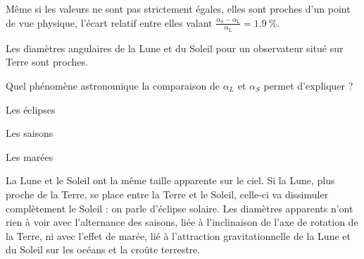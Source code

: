 \reponse{\reponseB{}}

\begin{corrige}
Même si les valeurs ne sont pas strictement égales, elles sont proches d'un point de vue physique, l'écart relatif entre elles valant $\frac{\alpha_\mathrm{S} - \alpha_\mathrm{L}}{\alpha_\mathrm{L}} = \SI{1,9}{\percent}$. 

Les diamètres angulaires de la Lune et du Soleil pour un observateur situé sur Terre sont proches. 
\end{corrige}




\begin{enonce}
Quel phénomène astronomique la comparaison de $\alpha_L$ et $\alpha_S$ permet d'expliquer ?

	\begin{listeQCM1Colonne}
	\item Les éclipses
	\item Les saisons
	\item Les marées
	\end{listeQCM1Colonne}
\end{enonce}

\reponse{\reponseA{}}

\begin{corrige}
La Lune et le Soleil ont la même taille apparente sur le ciel. Si la Lune, plus proche de la Terre, se place entre la Terre et le Soleil, celle-ci va dissimuler complètement le Soleil : on parle d'éclipse solaire. Les diamètres apparents n'ont rien à voir avec l'alternance des saisons, liée à l'inclinaison de l'axe de rotation de la Terre, ni avec l'effet de marée, lié à l'attraction gravitationnelle de la Lune et du Soleil sur les océans et la croûte terrestre.
\end{corrige}


\finEntrainement




\newpage




